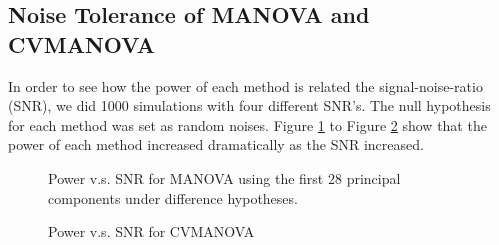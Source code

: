 \subsection{Noise Tolerance of MANOVA and CVMANOVA}

In order to see how the power of each method is related the signal-noise-ratio
(SNR), we did 1000 simulations with four different SNR's. The null
hypothesis for each method was set as random noises. Figure \ref{fig:MANOVA-SNR}
to Figure \ref{fig:CVMANOVA-SNR} show that the power of each method
increased dramatically as the SNR increased.

\begin{figure}[H]
\begin{centering}
\par\end{centering}

\centering{}\protect\caption{Power v.s. SNR for MANOVA using the first $28$ principal components
under difference hypotheses.\label{fig:MANOVA-SNR}}
\end{figure}


\begin{figure}[H]
\centering{}\protect\caption{Power v.s. SNR for CVMANOVA \label{fig:CVMANOVA-SNR}}
\end{figure}

